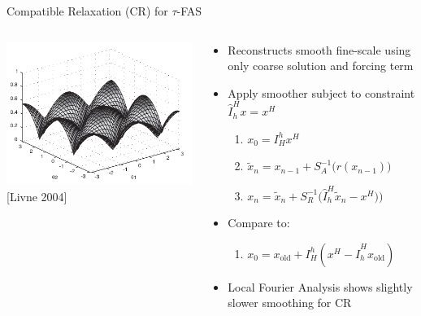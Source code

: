 \begin{frame}{Compatible Relaxation (CR) for $\tau$-FAS}
  \begin{columns}
    \begin{column}{0.5\textwidth}
      \includegraphics[width=\textwidth]{figures/LivneHabituatedCR} \\
      {\small [Livne 2004]}
    \end{column}
    \begin{column}{0.5\textwidth}
      \begin{itemize}
      \item Reconstructs smooth fine-scale using only coarse solution and forcing term
      \item Apply smoother subject to constraint $\hat I_h^H x = x^H$
        \begin{enumerate}
        \item $x_0 = I_H^h x^H$
        \item $\tilde x_n = x_{n-1} + S_A^{-1}\big(r(x_{n-1}) \big)$
        \item $x_n = \tilde x_n + S_R^{-1}\big(\hat I_h^H \tilde x_n - x^H) \big)$
        \end{enumerate}
      \item Compare to:
        \begin{enumerate}
        \item $x_0 = x_{\text{old}} + I_H^h (x^H - \hat I_h^H x_{\text{old}})$
        \end{enumerate}
      \item Local Fourier Analysis shows slightly slower smoothing for CR
      \end{itemize}
    \end{column}
  \end{columns}
\end{frame}
